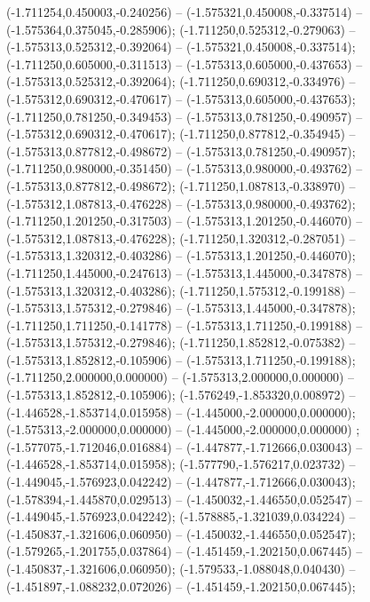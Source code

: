  (-1.711254,0.450003,-0.240256) -- (-1.575321,0.450008,-0.337514) -- (-1.575364,0.375045,-0.285906);
 (-1.711250,0.525312,-0.279063) -- (-1.575313,0.525312,-0.392064) -- (-1.575321,0.450008,-0.337514);
 (-1.711250,0.605000,-0.311513) -- (-1.575313,0.605000,-0.437653) -- (-1.575313,0.525312,-0.392064);
 (-1.711250,0.690312,-0.334976) -- (-1.575312,0.690312,-0.470617) -- (-1.575313,0.605000,-0.437653);
 (-1.711250,0.781250,-0.349453) -- (-1.575313,0.781250,-0.490957) -- (-1.575312,0.690312,-0.470617);
 (-1.711250,0.877812,-0.354945) -- (-1.575313,0.877812,-0.498672) -- (-1.575313,0.781250,-0.490957);
 (-1.711250,0.980000,-0.351450) -- (-1.575313,0.980000,-0.493762) -- (-1.575313,0.877812,-0.498672);
 (-1.711250,1.087813,-0.338970) -- (-1.575312,1.087813,-0.476228) -- (-1.575313,0.980000,-0.493762);
 (-1.711250,1.201250,-0.317503) -- (-1.575313,1.201250,-0.446070) -- (-1.575312,1.087813,-0.476228);
 (-1.711250,1.320312,-0.287051) -- (-1.575313,1.320312,-0.403286) -- (-1.575313,1.201250,-0.446070);
 (-1.711250,1.445000,-0.247613) -- (-1.575313,1.445000,-0.347878) -- (-1.575313,1.320312,-0.403286);
 (-1.711250,1.575312,-0.199188) -- (-1.575313,1.575312,-0.279846) -- (-1.575313,1.445000,-0.347878);
 (-1.711250,1.711250,-0.141778) -- (-1.575313,1.711250,-0.199188) -- (-1.575313,1.575312,-0.279846);
 (-1.711250,1.852812,-0.075382) -- (-1.575313,1.852812,-0.105906) -- (-1.575313,1.711250,-0.199188);
 (-1.711250,2.000000,0.000000) -- (-1.575313,2.000000,0.000000) -- (-1.575313,1.852812,-0.105906);
 (-1.576249,-1.853320,0.008972) -- (-1.446528,-1.853714,0.015958) -- (-1.445000,-2.000000,0.000000);
 (-1.575313,-2.000000,0.000000) -- (-1.445000,-2.000000,0.000000) ;
 (-1.577075,-1.712046,0.016884) -- (-1.447877,-1.712666,0.030043) -- (-1.446528,-1.853714,0.015958);
 (-1.577790,-1.576217,0.023732) -- (-1.449045,-1.576923,0.042242) -- (-1.447877,-1.712666,0.030043);
 (-1.578394,-1.445870,0.029513) -- (-1.450032,-1.446550,0.052547) -- (-1.449045,-1.576923,0.042242);
 (-1.578885,-1.321039,0.034224) -- (-1.450837,-1.321606,0.060950) -- (-1.450032,-1.446550,0.052547);
 (-1.579265,-1.201755,0.037864) -- (-1.451459,-1.202150,0.067445) -- (-1.450837,-1.321606,0.060950);
 (-1.579533,-1.088048,0.040430) -- (-1.451897,-1.088232,0.072026) -- (-1.451459,-1.202150,0.067445);
